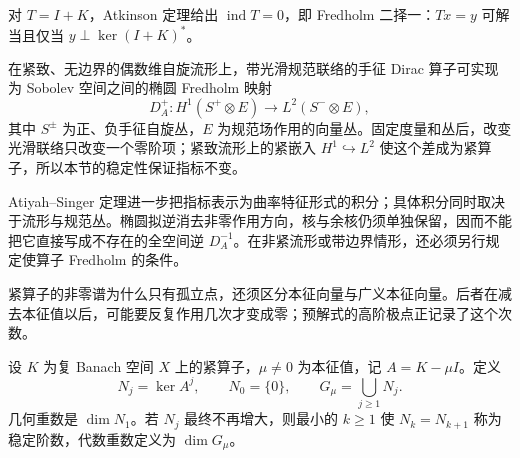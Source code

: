 对 $T=I+K$，Atkinson 定理给出 $\operatorname{ind}T=0$，即 Fredholm 二择一：$Tx=y$ 可解当且仅当 $y\perp\ker(I+K)^*$。

在紧致、无边界的偶数维自旋流形上，带光滑规范联络的手征 Dirac 算子可实现为 Sobolev 空间之间的椭圆 Fredholm 映射
\[
D_A^+:H^1(S^+\otimes E)\longrightarrow L^2(S^-\otimes E),
\]
其中 $S^\pm$ 为正、负手征自旋丛，$E$ 为规范场作用的向量丛。固定度量和丛后，改变光滑联络只改变一个零阶项；紧致流形上的紧嵌入 $H^1\hookrightarrow L^2$ 使这个差成为紧算子，所以本节的稳定性保证指标不变。

Atiyah--Singer 定理进一步把指标表示为曲率特征形式的积分；具体积分同时取决于流形与规范丛。椭圆拟逆消去非零作用方向，核与余核仍须单独保留，因而不能把它直接写成不存在的全空间逆 $D_A^{-1}$。在非紧流形或带边界情形，还必须另行规定使算子 Fredholm 的条件。

紧算子的非零谱为什么只有孤立点，还须区分本征向量与广义本征向量。后者在减去本征值以后，可能要反复作用几次才变成零；预解式的高阶极点正记录了这个次数。

\begin{definition}[广义本征空间与重数]
设 $K$ 为复 Banach 空间 $X$ 上的紧算子，$\mu\ne0$ 为本征值，记 $A=K-\mu I$。定义
\[
N_j=\ker A^j,\qquad N_0=\{0\},
\qquad G_\mu=\bigcup_{j\ge1}N_j.
\]
几何重数是 $\dim N_1$。若 $N_j$ 最终不再增大，则最小的 $k\ge1$ 使 $N_k=N_{k+1}$ 称为稳定阶数，代数重数定义为 $\dim G_\mu$。
\end{definition}


